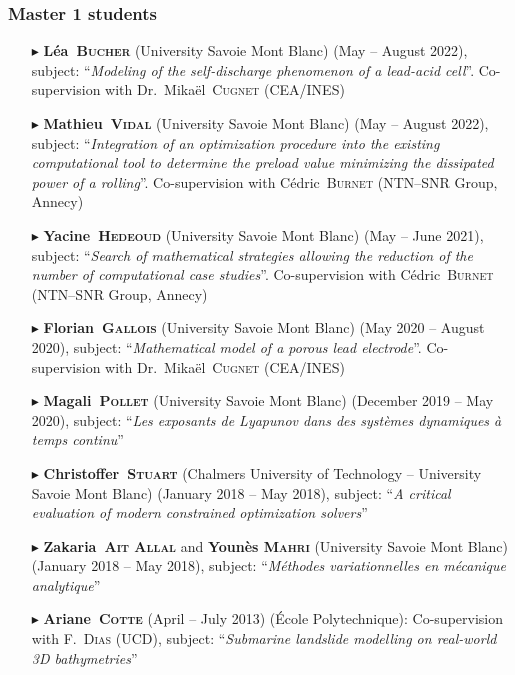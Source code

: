         \subsubsection{Master 1 students}
        \begin{itemize}
            \item[$\blacktriangleright$] \textbf{L\'ea~\textsc{Bucher}} (University Savoie Mont Blanc) (May -- August 2022), subject: ``\textit{Modeling of the self-discharge phenomenon of a lead-acid cell}''. Co-supervision with Dr.~Mika\"el~\textsc{Cugnet} (CEA/INES)
            \item[$\blacktriangleright$] \textbf{Mathieu~\textsc{Vidal}} (University Savoie Mont Blanc) (May -- August 2022), subject: ``\textit{Integration of an optimization procedure into the existing computational tool to determine the preload value minimizing the dissipated power of a rolling}''. Co-supervision with C\'edric~\textsc{Burnet} (NTN--SNR Group, Annecy)
            \item[$\blacktriangleright$] \textbf{Yacine~\textsc{Hedeoud}} (University Savoie Mont Blanc) (May -- June 2021), subject: ``\textit{Search of mathematical strategies allowing the reduction of the number of computational case studies}''. Co-supervision with C\'edric~\textsc{Burnet} (NTN--SNR Group, Annecy)
            \item[$\blacktriangleright$] \textbf{Florian~\textsc{Gallois}} (University Savoie Mont Blanc) (May 2020 -- August 2020), subject: ``\textit{Mathematical model of a porous lead electrode}''. Co-supervision with Dr.~Mika\"el~\textsc{Cugnet} (CEA/INES)
            \item[$\blacktriangleright$] \textbf{Magali~\textsc{Pollet}} (University Savoie Mont Blanc) (December 2019 -- May 2020), subject: ``\textit{Les exposants de Lyapunov dans des syst\`emes dynamiques \`a temps continu}''
            \item[$\blacktriangleright$] \textbf{Christoffer~\textsc{Stuart}} (Chalmers University of Technology -- University Savoie Mont Blanc) (January 2018 -- May 2018), subject: ``\textit{A critical evaluation of modern constrained optimization solvers}''
            \item[$\blacktriangleright$] \textbf{Zakaria~\textsc{Ait Allal}} and \textbf{Youn\`es \textsc{Mahri}} (University Savoie Mont Blanc) (January 2018 -- May 2018), subject: ``\textit{M\'ethodes variationnelles en m\'ecanique analytique}''
            \item[$\blacktriangleright$] \textbf{Ariane~\textsc{Cotte}} (April -- July 2013) (\'Ecole Polytechnique): Co-supervision with F.~\textsc{Dias} (UCD), subject: ``\textit{Submarine landslide modelling on real-world 3D bathymetries}''

\end{itemize}

